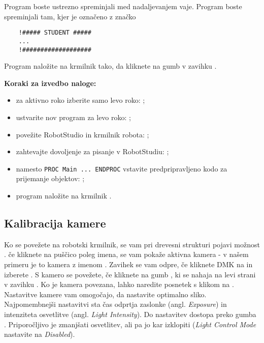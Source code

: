 Program boste ustrezno spreminjali med nadaljevanjem vaje. Program boste spreminjali tam, kjer je označeno z značko
\begin{verbatim}
	!##### STUDENT #####
	...
	!###################
\end{verbatim}

Program naložite na krmilnik tako, da kliknete na gumb  v zavihku .

\vspace{5mm}

\begin{mdframed}[backgroundcolor=yellow!20, shadow=true,roundcorner=8pt]
	\textbf{Koraki za izvedbo naloge:}
	\begin{itemize}
		\item za aktivno roko izberite samo levo roko: ;
		\item ustvarite nov program za levo roko: ;
		\item povežite RobotStudio in krmilnik robota: ;
		\item zahtevajte dovoljenje za pisanje v RobotStudiu: ;
		\item namesto \verb"PROC Main ... ENDPROC" vstavite predpripravljeno kodo za prijemanje objektov: ;
		\item program naložite na krmilnik .
	\end{itemize}
\end{mdframed}


\subsection{Kalibracija kamere}
\label{ch:kalibracija_kamere}

Ko se povežete na robotski krmilnik, se vam pri drevesni strukturi pojavi možnost . če kliknete na puščico poleg imena, se vam pokaže aktivna kamera - v našem primeru je to kamera z imenom . Zavihek  se vam odpre, če kliknete DMK na  in izberete . S kamero se povežete, če kliknete na gumb , ki se nahaja na levi strani v zavihku . Ko je kamera povezana, lahko naredite posnetek s klikom na . Nastavitve kamere vam omogočajo, da nastavite optimalno sliko. Najpomembnejši nastavitvi sta čas odprtja zaslonke (angl. \emph{Exposure}) in intenziteta osvetlitve (angl. \emph{Light Intensity}). Do nastavitev dostopa preko gumba . Priporočljivo je zmanjšati osvetlitev, ali pa jo kar izklopiti (\emph{Light Control Mode} nastavite na \emph{Disabled}).

